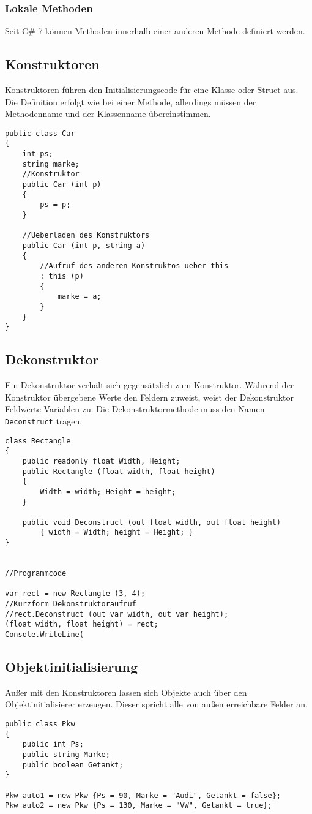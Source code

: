 \subsubsection{Lokale Methoden}
Seit C\# 7 können Methoden innerhalb einer anderen Methode definiert werden.
\subsection{Konstruktoren}
Konstruktoren führen den Initialisierungscode für eine Klasse oder Struct aus. Die Definition erfolgt wie bei einer Methode, allerdings müssen der Methodenname und der Klassenname übereinstimmen.
\begin{lstlisting}
public class Car
{
	int ps;
	string marke;	
	//Konstruktor
	public Car (int p)
	{
		ps = p;
	}

	//Ueberladen des Konstruktors
	public Car (int p, string a)
	{
		//Aufruf des anderen Konstruktos ueber this
		: this (p)
		{
			marke = a;
		}
	}
}
 \end{lstlisting}
\subsection{Dekonstruktor}
Ein Dekonstruktor verhält sich gegensätzlich zum Konstruktor. Während der Konstruktor übergebene Werte den Feldern zuweist, weist der Dekonstruktor Feldwerte Variablen zu. Die Dekonstruktormethode muss den Namen \texttt{Deconstruct} tragen.
\begin{lstlisting}
class Rectangle
{
	public readonly float Width, Height;
	public Rectangle (float width, float height)
	{
		Width = width; Height = height;
	}

	public void Deconstruct (out float width, out float height)
		{ width = Width; height = Height; }
}


//Programmcode

var rect = new Rectangle (3, 4);
//Kurzform Dekonstruktoraufruf
//rect.Deconstruct (out var width, out var height);
(float width, float height) = rect;
Console.WriteLine(
\end{lstlisting}
\subsection{Objektinitialisierung}
Außer mit den Konstruktoren lassen sich Objekte auch über den Objektinitialisierer erzeugen. Dieser spricht alle von außen erreichbare Felder an.
\begin{lstlisting}
public class Pkw
{
	public int Ps;
	public string Marke;
	public boolean Getankt;
}

Pkw auto1 = new Pkw {Ps = 90, Marke = "Audi", Getankt = false};
Pkw auto2 = new Pkw {Ps = 130, Marke = "VW", Getankt = true};
\end{lstlisting}
